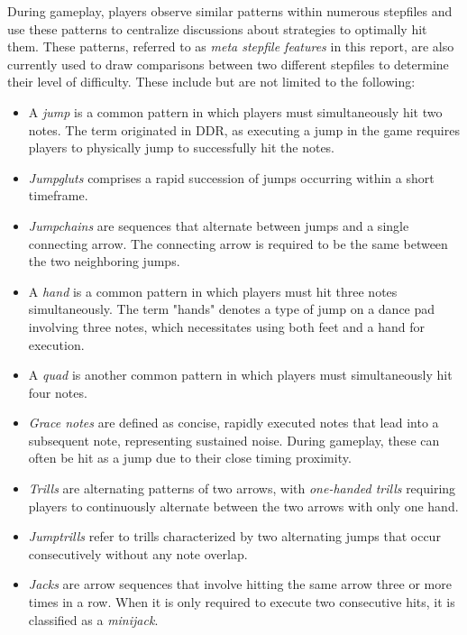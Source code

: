During gameplay, players observe similar patterns within numerous stepfiles and use these patterns to centralize discussions about strategies to optimally hit them. These patterns, referred to as \textit{meta stepfile features} in this report, are also currently used to draw comparisons between two different stepfiles to determine their level of difficulty. These include but are not limited to the following:

\begin{itemize}
	\item A \textit{jump} is a common pattern in which players must simultaneously hit two notes. The term originated in DDR, as executing a jump in the game requires players to physically jump to successfully hit the notes.
	      
	\item \textit{Jumpgluts} comprises a rapid succession of jumps occurring within a short timeframe.
	      
	\item \textit{Jumpchains} are sequences that alternate between jumps and a single connecting arrow. The connecting arrow is required to be the same between the two neighboring jumps.
	      
	\item A \textit{hand} is a common pattern in which players must hit three notes simultaneously. The term "hands" denotes a type of jump on a dance pad involving three notes, which necessitates using both feet and a hand for execution.
	      
	\item A \textit{quad} is another common pattern in which players must simultaneously hit four notes.
	      
	\item \textit{Grace notes} are defined as concise, rapidly executed notes that lead into a subsequent note, representing sustained noise.  During gameplay, these can often be hit as a jump due to their close timing proximity.
	      
	\item \textit{Trills} are alternating patterns of two arrows, with \textit{one-handed trills} requiring players to continuously alternate between the two arrows with only one hand.
	      
	\item \textit{Jumptrills} refer to trills characterized by two alternating jumps that occur consecutively without any note overlap.
	      
	\item \textit{Jacks} are arrow sequences that involve hitting the same arrow three or more times in a row. When it is only required to execute two consecutive hits, it is classified as a \textit{minijack}.
	      

\end{itemize}
